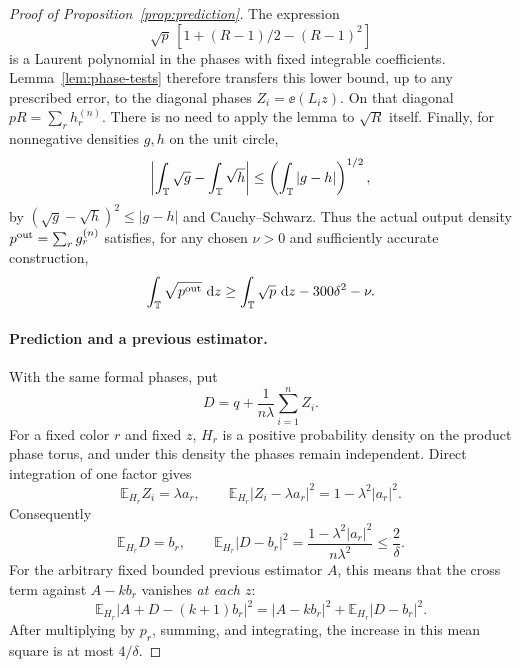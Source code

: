 \begin{proof}[Proof of Proposition~\ref{prop:prediction}]
The expression
\[
 \sqrt p\,[1+(R-1)/2-(R-1)^2]
\]
is a Laurent polynomial in the phases with fixed integrable
coefficients.  Lemma~\ref{lem:phase-tests} therefore transfers this
lower bound, up to any prescribed error, to the diagonal phases
$Z_i=\ee(L_i z)$.  On that diagonal
$pR=\sum_r h_r^{(n)}$.
There is no need to apply the lemma to $\sqrt R$ itself.
Finally, for nonnegative densities $g,h$ on the unit circle,
\begin{equation}
 \left|\int_\mathbb T\sqrt g-\int_\mathbb T\sqrt h\right|
 \le\left(\int_\mathbb T|g-h|\right)^{1/2},
 \label{eq:block-density-hellinger-error}
\end{equation}
by $(\sqrt g-\sqrt h)^2\le|g-h|$ and Cauchy--Schwarz.
Thus the actual output density $p^{\rm out}=\sum_rg_r^{(n)}$
satisfies, for any chosen $\nu>0$ and sufficiently accurate
construction,
\begin{equation}
 \int_\mathbb T\sqrt{p^{\rm out}}\,\,\mathrm d z
 \ge\int_\mathbb T\sqrt p\,\,\mathrm d z-300\delta^2-\nu.
 \label{eq:block-hellinger-step}
\end{equation}

\paragraph{Prediction and a previous estimator.}
With the same formal phases, put
\[
 D=q+\frac1{n\lambda}\sum_{i=1}^n Z_i.
\]
For a fixed color $r$ and fixed $z$, $H_r$ is a positive probability
density on the product phase torus, and under this density the phases
remain independent.  Direct integration of one factor gives
\[
 \mathbb E_{H_r}Z_i=\lambda a_r,
 \qquad
 \mathbb E_{H_r}|Z_i-\lambda a_r|^2
       =1-\lambda^2|a_r|^2.
\]
Consequently
\begin{equation}
 \mathbb E_{H_r}D=b_r,
 \qquad
 \mathbb E_{H_r}|D-b_r|^2
 =\frac{1-\lambda^2|a_r|^2}{n\lambda^2}
 \le\frac2\delta.
 \label{eq:block-estimator-moments}
\end{equation}
For the arbitrary fixed bounded previous estimator $A$, this means
that the cross term against $A-kb_r$ vanishes \emph{at each $z$}:
\[
 \mathbb E_{H_r}|A+D-(k+1)b_r|^2
 =|A-kb_r|^2+\mathbb E_{H_r}|D-b_r|^2.
\]
After multiplying by $p_r$, summing, and integrating, the increase
in this mean square is at most $4/\delta$.


\end{proof}
